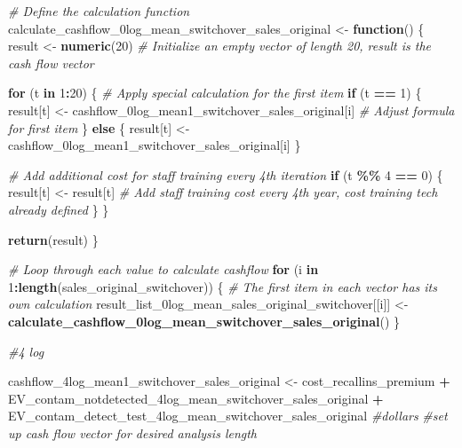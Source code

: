 \documentclass[
]{article}
\newenvironment{Shaded}{\begin{snugshade}}{\end{snugshade}}
\newcommand{\CommentTok}[1]{\textcolor[rgb]{0.56,0.35,0.01}{\textit{#1}}}
\newcommand{\ControlFlowTok}[1]{\textcolor[rgb]{0.13,0.29,0.53}{\textbf{#1}}}
\newcommand{\DecValTok}[1]{\textcolor[rgb]{0.00,0.00,0.81}{#1}}
\newcommand{\FunctionTok}[1]{\textcolor[rgb]{0.13,0.29,0.53}{\textbf{#1}}}
\newcommand{\NormalTok}[1]{#1}
\newcommand{\OtherTok}[1]{\textcolor[rgb]{0.56,0.35,0.01}{#1}}
\newcommand{\SpecialCharTok}[1]{\textcolor[rgb]{0.81,0.36,0.00}{\textbf{#1}}}
\begin{document}
\begin{Shaded}
\begin{Highlighting}[]
\CommentTok{\# Define the calculation function}
\NormalTok{calculate\_cashflow\_0log\_mean\_switchover\_sales\_original }\OtherTok{\textless{}{-}} \ControlFlowTok{function}\NormalTok{() \{}
\NormalTok{  result }\OtherTok{\textless{}{-}} \FunctionTok{numeric}\NormalTok{(}\DecValTok{20}\NormalTok{)  }\CommentTok{\# Initialize an empty vector of length 20, result is the cash flow vector}
  
  \ControlFlowTok{for}\NormalTok{ (t }\ControlFlowTok{in} \DecValTok{1}\SpecialCharTok{:}\DecValTok{20}\NormalTok{) \{}
    \CommentTok{\# Apply special calculation for the first item}
    \ControlFlowTok{if}\NormalTok{ (t }\SpecialCharTok{==} \DecValTok{1}\NormalTok{) \{}
\NormalTok{      result[t] }\OtherTok{\textless{}{-}}\NormalTok{ cashflow\_0log\_mean1\_switchover\_sales\_original[i] }\CommentTok{\# Adjust formula for first item}
\NormalTok{    \} }\ControlFlowTok{else}\NormalTok{ \{}
\NormalTok{      result[t] }\OtherTok{\textless{}{-}}\NormalTok{ cashflow\_0log\_mean1\_switchover\_sales\_original[i]}
\NormalTok{    \}}
    
    \CommentTok{\# Add additional cost for staff training every 4th iteration}
    \ControlFlowTok{if}\NormalTok{ (t }\SpecialCharTok{\%\%} \DecValTok{4} \SpecialCharTok{==} \DecValTok{0}\NormalTok{) \{}
\NormalTok{      result[t] }\OtherTok{\textless{}{-}}\NormalTok{ result[t]  }\CommentTok{\# Add staff training cost every 4th year, cost training tech already defined}
\NormalTok{    \}}
\NormalTok{  \}}
  
  \FunctionTok{return}\NormalTok{(result)}
\NormalTok{\}}

\CommentTok{\# Loop through each value to calculate cashflow}
\ControlFlowTok{for}\NormalTok{ (i }\ControlFlowTok{in} \DecValTok{1}\SpecialCharTok{:}\FunctionTok{length}\NormalTok{(sales\_original\_switchover)) \{}
  \CommentTok{\# The first item in each vector has its own calculation}
\NormalTok{  result\_list\_0log\_mean\_sales\_original\_switchover[[i]] }\OtherTok{\textless{}{-}} \FunctionTok{calculate\_cashflow\_0log\_mean\_switchover\_sales\_original}\NormalTok{()}
\NormalTok{\}}



\CommentTok{\#4 log}

\NormalTok{cashflow\_4log\_mean1\_switchover\_sales\_original }\OtherTok{\textless{}{-}}\NormalTok{ cost\_recallins\_premium }\SpecialCharTok{+}\NormalTok{ EV\_contam\_notdetected\_4log\_mean\_switchover\_sales\_original }\SpecialCharTok{+}\NormalTok{ EV\_contam\_detect\_test\_4log\_mean\_switchover\_sales\_original }\CommentTok{\#dollars}
\CommentTok{\#set up cash flow vector for desired analysis length}


\end{Highlighting}
\end{Shaded}
\end{document}
